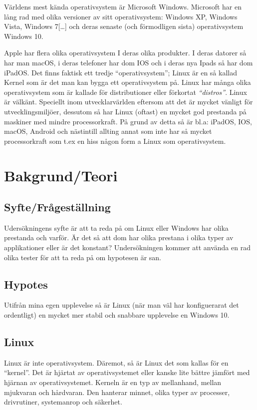 \documentclass[12pt, a4paper]{report}
\begin{document}
   Världens mest kända operativsystem\cite{winstat} är Microsoft Windows. Microsoft har en lång rad med olika versioner av sitt operativsystem\cite{windows}: Windows XP, Windows Vista, Windows 7[\dots] och deras senaste (och förmodligen sista) operativsystem Windows 10.
    
   Apple har flera olika operativsystem\cite{appleOS} I deras olika produkter. I deras datorer så har man macOS, i deras telefoner har dom IOS och i deras nya Ipads så har dom iPadOS.
    Det finns faktisk ett tredje ``operativsystem''; Linux är en så kallad Kernel \cite{redhat} som är det man kan bygga ett operativsystem på. Linux har många olika operativsystem som är kallade för distributioner eller förkortat \textit{``distros''}. Linux är välkänt. Speciellt inom utvecklarvärlden eftersom att det är mycket vänligt för utvecklingsmiljöer, dessutom så har Linux (oftast) en mycket god prestanda på maskiner med mindre processorkraft\cite{whatislinux}. På grund av detta så är bl.a: iPadOS, IOS, macOS, Android och nästintill allting annat som inte har så mycket processorkraft som t.ex en hiss någon form a Linux som operativsystem.
    
\section{Bakgrund/Teori}


    \subsection{Syfte/Frågeställning}
    Udersökningens syfte är att ta reda på om Linux eller Windows har olika prestanda och varför. Är det så att dom har olika prestana i olika typer av applikationer eller är det konstant? Undersökningen kommer att använda en rad olika tester för att ta reda på om hypotesen är san.
 

    \subsection{Hypotes}

    Utifrån mina egen upplevelse så är Linux (när man väl har konfiguerarat det ordentligt) en mycket mer stabil och snabbare upplevelse en Windows 10.
 

    \subsection{Linux}
 
   Linux är inte operativsystem. Däremot, så är Linux det som kallas för en ``kernel''\cite{redhat}. Det är hjärtat av operativsystemet eller kanske lite bättre jämfört med hjärnan av operativsystemet. Kerneln är en typ av mellanhand, mellan mjukvaran och hårdvaran. Den hanterar minnet, olika typer av processer, drivrutiner, systemanrop och säkerhet.
 
\end{document}
